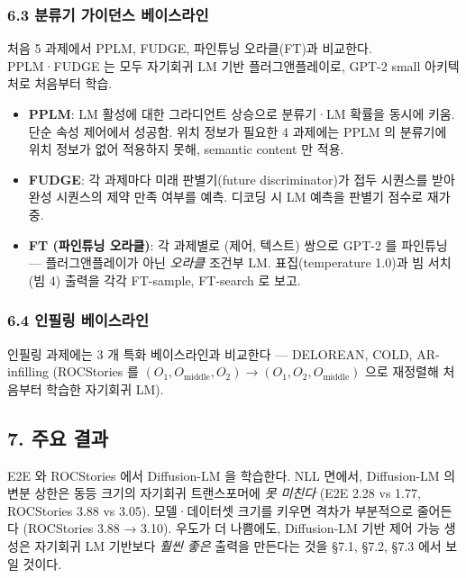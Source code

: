 \documentclass[
]{article}
\providecommand{\tightlist}{%
  \setlength{\itemsep}{0pt}\setlength{\parskip}{0pt}}
\begin{document}
\hypertarget{uxbd84uxb958uxae30-uxac00uxc774uxb358uxc2a4-uxbca0uxc774uxc2a4uxb77cuxc778}{%
\subsubsection{6.3 분류기 가이던스
베이스라인}\label{uxbd84uxb958uxae30-uxac00uxc774uxb358uxc2a4-uxbca0uxc774uxc2a4uxb77cuxc778}}

처음 5 과제에서 PPLM, FUDGE, 파인튜닝 오라클(FT)과 비교한다. PPLM·FUDGE
는 모두 자기회귀 LM 기반 플러그앤플레이로, GPT-2 small 아키텍처로
처음부터 학습.

\begin{itemize}
\tightlist
\item
  \textbf{PPLM}: LM 활성에 대한 그라디언트 상승으로 분류기·LM 확률을
  동시에 키움. 단순 속성 제어에서 성공함. 위치 정보가 필요한 4 과제에는
  PPLM 의 분류기에 위치 정보가 없어 적용하지 못해, semantic content 만
  적용.
\item
  \textbf{FUDGE}: 각 과제마다 미래 판별기(future discriminator)가 접두
  시퀀스를 받아 완성 시퀀스의 제약 만족 여부를 예측. 디코딩 시 LM 예측을
  판별기 점수로 재가중.
\item
  \textbf{FT (파인튜닝 오라클)}: 각 과제별로 (제어, 텍스트) 쌍으로 GPT-2
  를 파인튜닝 --- 플러그앤플레이가 아닌 \emph{오라클} 조건부 LM.
  표집(temperature 1.0)과 빔 서치(빔 4) 출력을 각각 FT-sample, FT-search
  로 보고.
\end{itemize}

\hypertarget{uxc778uxd544uxb9c1-uxbca0uxc774uxc2a4uxb77cuxc778}{%
\subsubsection{6.4 인필링
베이스라인}\label{uxc778uxd544uxb9c1-uxbca0uxc774uxc2a4uxb77cuxc778}}

인필링 과제에는 3 개 특화 베이스라인과 비교한다 --- DELOREAN, COLD,
AR-infilling (ROCStories 를
\((O_1, O_\text{middle}, O_2) \to (O_1, O_2, O_\text{middle})\) 으로
재정렬해 처음부터 학습한 자기회귀 LM).

\hypertarget{uxc8fcuxc694-uxacb0uxacfc}{%
\subsection{7. 주요 결과}\label{uxc8fcuxc694-uxacb0uxacfc}}

E2E 와 ROCStories 에서 Diffusion-LM 을 학습한다. NLL 면에서,
Diffusion-LM 의 변분 상한은 동등 크기의 자기회귀 트랜스포머에 \emph{못
미친다} (E2E 2.28 vs 1.77, ROCStories 3.88 vs 3.05). 모델·데이터셋
크기를 키우면 격차가 부분적으로 줄어든다 (ROCStories 3.88 → 3.10).
우도가 더 나쁨에도, Diffusion-LM 기반 제어 가능 생성은 자기회귀 LM
기반보다 \emph{훨씬 좋은} 출력을 만든다는 것을 §7.1, §7.2, §7.3 에서
보일 것이다.
\end{document}
